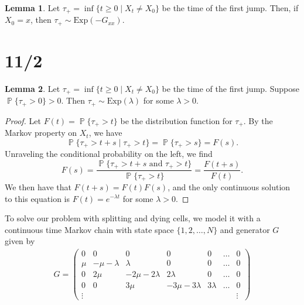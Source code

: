 \documentclass{article}
\theoremstyle{definition}
\newtheorem{lem}{Lemma}
\DeclareMathOperator{\p}{\mathbb{P}}
\begin{document}
\begin{lem} 
Let $\tau_+ = \inf\{ t\geq 0 \mid X_t \neq X_0\}$ be the time of the first jump. Then, if $X_{0} = x$, then $\tau_+ \sim \text{Exp}(-G_{xx})$.

\end{lem}



\section*{11/2}

\begin{lem}
	Let $\tau_+ = \inf\{ t\geq 0 \mid X_t \neq X_0\}$ be the time of the first jump. Suppose $\p\{\tau_+ > 0\} >0$. Then $\tau_+ \sim \text{Exp}(\lambda)$ for some $\lambda>0$. 
\end{lem}
\begin{proof}
	Let $F(t) = \p\{\tau_+ > t\}$ be the distribution function for $\tau_+$. By the Markov property on $X_t$, we have
	\[
		\p\{\tau_+ > t+s \mid \tau_+ > t\} = \p\{\tau_+ > s\} = F(s).
	\]
	Unraveling the conditional probability on the left, we find 
	\[
	F(s) = \frac{\p\{\tau_+>t+s \text{ and } \tau_+ > t\}}{\p\{\tau_+ > t\}} = \frac{F(t+s)}{F(t)}.
	\]
	We then have that $F(t+s) = F(t) F(s)$, and the only continuous solution to this equation is $F(t) = e^{-\lambda t}$ for some $\lambda >0$.
	
\end{proof}

To solve our problem with splitting and dying cells, we model it with a continuous time Markov chain with state space $\{1, 2, \dots, N\}$ and generator $G$ given by
\begin{align*}
	G = \begin{pmatrix}
		0 & 0 & 0 & 0 & 0 &\dots & 0\\
		\mu & -\mu-\lambda & \lambda & 0 & 0 & \dots & 0\\
		0 & 2\mu & -2\mu-2\lambda & 2\lambda & 0 & \dots & 0\\
		0 & 0 & 3\mu & -3\mu-3\lambda & 3\lambda & \dots & 0 \\
		\vdots & & & & & & \vdots 
	\end{pmatrix}
\end{align*}
\end{document}
